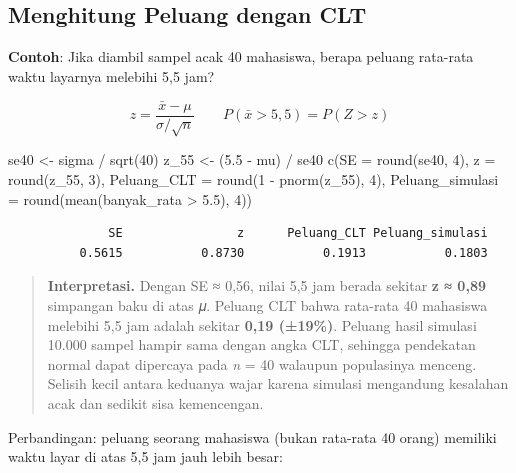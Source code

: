 \documentclass[
  indonesian,
  letterpaper,
]{book}
\newenvironment{Shaded}{\begin{snugshade}}{\end{snugshade}}
\newcommand{\AttributeTok}[1]{\textcolor[rgb]{0.40,0.45,0.13}{#1}}
\newcommand{\DecValTok}[1]{\textcolor[rgb]{0.68,0.00,0.00}{#1}}
\newcommand{\FloatTok}[1]{\textcolor[rgb]{0.68,0.00,0.00}{#1}}
\newcommand{\FunctionTok}[1]{\textcolor[rgb]{0.28,0.35,0.67}{#1}}
\newcommand{\NormalTok}[1]{\textcolor[rgb]{0.00,0.23,0.31}{#1}}
\newcommand{\OtherTok}[1]{\textcolor[rgb]{0.00,0.23,0.31}{#1}}
\newcommand{\SpecialCharTok}[1]{\textcolor[rgb]{0.37,0.37,0.37}{#1}}
\begin{document}
\subsection{Menghitung Peluang dengan
CLT}\label{menghitung-peluang-dengan-clt}

\textbf{Contoh}: Jika diambil sampel acak 40 mahasiswa, berapa peluang
rata-rata waktu layarnya melebihi 5,5 jam?

\[z = \frac{\bar{x} - \mu}{\sigma / \sqrt{n}} \qquad P(\bar{x} > 5,5) = P(Z > z)\]

\begin{Shaded}
\begin{Highlighting}[]
\NormalTok{se40 }\OtherTok{\textless{}{-}}\NormalTok{ sigma }\SpecialCharTok{/} \FunctionTok{sqrt}\NormalTok{(}\DecValTok{40}\NormalTok{)}
\NormalTok{z\_55 }\OtherTok{\textless{}{-}}\NormalTok{ (}\FloatTok{5.5} \SpecialCharTok{{-}}\NormalTok{ mu) }\SpecialCharTok{/}\NormalTok{ se40}
\FunctionTok{c}\NormalTok{(}\AttributeTok{SE =} \FunctionTok{round}\NormalTok{(se40, }\DecValTok{4}\NormalTok{), }\AttributeTok{z =} \FunctionTok{round}\NormalTok{(z\_55, }\DecValTok{3}\NormalTok{),}
\AttributeTok{Peluang\_CLT =} \FunctionTok{round}\NormalTok{(}\DecValTok{1} \SpecialCharTok{{-}} \FunctionTok{pnorm}\NormalTok{(z\_55), }\DecValTok{4}\NormalTok{),}
\AttributeTok{Peluang\_simulasi =} \FunctionTok{round}\NormalTok{(}\FunctionTok{mean}\NormalTok{(banyak\_rata }\SpecialCharTok{\textgreater{}} \FloatTok{5.5}\NormalTok{), }\DecValTok{4}\NormalTok{))}
\end{Highlighting}
\end{Shaded}

\begin{verbatim}
              SE                z      Peluang_CLT Peluang_simulasi 
          0.5615           0.8730           0.1913           0.1803 
\end{verbatim}

\begin{quote}
\textbf{Interpretasi.} Dengan SE ≈ 0,56, nilai 5,5 jam berada sekitar
\textbf{z ≈ 0,89} simpangan baku di atas 𝜇. Peluang CLT bahwa rata-rata
40 mahasiswa melebihi 5,5 jam adalah sekitar \textbf{0,19 (±19\%)}.
Peluang hasil simulasi 10.000 sampel hampir sama dengan angka CLT,
sehingga pendekatan normal dapat dipercaya pada \emph{n} = 40 walaupun
populasinya menceng. Selisih kecil antara keduanya wajar karena simulasi
mengandung kesalahan acak dan sedikit sisa kemencengan.
\end{quote}

Perbandingan: peluang seorang mahasiswa (bukan rata-rata 40 orang)
memiliki waktu layar di atas 5,5 jam jauh lebih besar:
\end{document}

